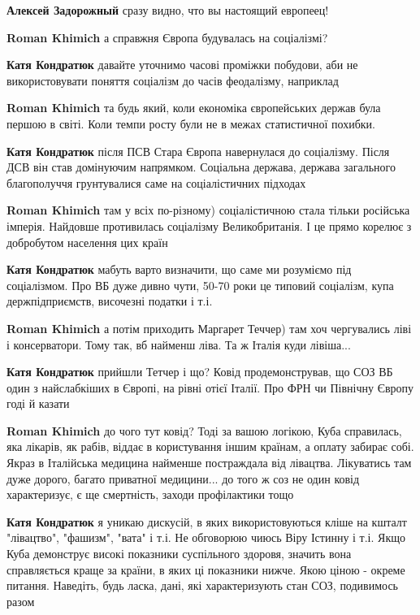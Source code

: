 \begin{itemize}
\begin{itemize} %
\textbf{Алексей Задорожный} сразу видно, что вы настоящий европеец!

\textbf{Roman Khimich} а справжня Європа будувалась на соціалізмі?

\textbf{Катя Кондратюк} давайте уточнимо часові проміжки побудови, аби не використовувати поняття соціалізм до часів феодалізму, наприклад

\textbf{Roman Khimich} та будь який, коли економіка європейських держав була першою в світі. Коли темпи росту були не в межах статистичної похибки.

\textbf{Катя Кондратюк} після ПСВ Стара Європа навернулася до соціалізму. Після ДСВ він став домінуючим напрямком. Соціальна держава, держава загального благополуччя грунтувалися саме на соціалістичних підходах

\textbf{Roman Khimich} там у всіх по-різному) соціалістичною стала тільки російська імперія. Найдовше противилась соціалізму Великобританія. І це прямо корелює з добробутом населення цих країн

\textbf{Катя Кондратюк} мабуть варто визначити, що саме ми розуміємо під соціалізмом.
Про ВБ дуже дивно чути, 50-70 роки це типовий соціалізм, купа держпідприємств, височезні податки і т.і.

\textbf{Roman Khimich} а потім приходить Маргарет Теччер) там хоч чергувались ліві і консерватори. Тому так, вб найменш ліва. Та ж Італія куди лівіша...

\textbf{Катя Кондратюк} прийшли Тетчер і що? Ковід продемонстрував, що СОЗ ВБ один з найслабкіших в Європі, на рівні отієї Італії. Про ФРН чи Північну Європу годі й казати

\textbf{Roman Khimich} до чого тут ковід? Тоді за вашою логікою, Куба справилась, яка лікарів, як рабів, віддає в користування іншим країнам, а оплату забирає собі. Якраз в Італійська медицина найменше постраждала від лівацтва. Лікуватись там дуже дорого, багато приватної медицини... до того ж соз не один ковід характеризує, є ще смертність, заходи профілактики тощо

\textbf{Катя Кондратюк} я уникаю дискусій, в яких використовуються кліше на кшталт "лівацтво", "фашизм", "вата" і т.і. Не обговорюю чиюсь Віру Істинну і т.і.
Якщо Куба демонструє високі показники суспільного здоровя, значить вона справляється краще за країни, в яких ці показники нижче. Якою ціною - окреме питання.
Наведіть, будь ласка, дані, які характеризують стан СОЗ, подивимось разом
\end{itemize} %


\end{itemize}
